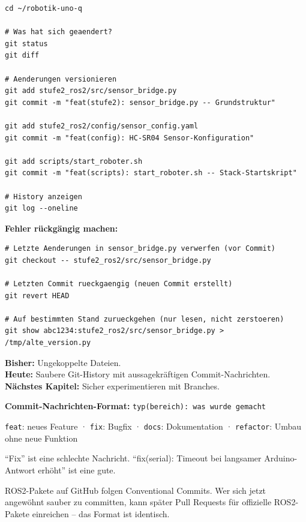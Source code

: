 \begin{lstlisting}[style=bash]
cd ~/robotik-uno-q

# Was hat sich geaendert?
git status
git diff

# Aenderungen versionieren
git add stufe2_ros2/src/sensor_bridge.py
git commit -m "feat(stufe2): sensor_bridge.py -- Grundstruktur"

git add stufe2_ros2/config/sensor_config.yaml
git commit -m "feat(config): HC-SR04 Sensor-Konfiguration"

git add scripts/start_roboter.sh
git commit -m "feat(scripts): start_roboter.sh -- Stack-Startskript"

# History anzeigen
git log --oneline
\end{lstlisting}

\begin{loesungBox}
\textbf{Fehler rückgängig machen:}
\begin{lstlisting}[style=bash]
# Letzte Aenderungen in sensor_bridge.py verwerfen (vor Commit)
git checkout -- stufe2_ros2/src/sensor_bridge.py

# Letzten Commit rueckgaengig (neuen Commit erstellt)
git revert HEAD

# Auf bestimmten Stand zurueckgehen (nur lesen, nicht zerstoeren)
git show abc1234:stufe2_ros2/src/sensor_bridge.py > /tmp/alte_version.py
\end{lstlisting}
\end{loesungBox}

\begin{projektBox}
\textbf{Bisher:} Ungekoppelte Dateien.\\
\textbf{Heute:} Saubere Git-History mit aussagekräftigen Commit-Nachrichten.\\
\textbf{Nächstes Kapitel:} Sicher experimentieren mit Branches.
\end{projektBox}

\begin{merksatzBox}
\textbf{Commit-Nachrichten-Format:} \texttt{typ(bereich): was wurde gemacht}

\texttt{feat}: neues Feature ·
\texttt{fix}: Bugfix ·
\texttt{docs}: Dokumentation ·
\texttt{refactor}: Umbau ohne neue Funktion

\enquote{Fix} ist eine schlechte Nachricht.
\enquote{fix(serial): Timeout bei langsamer Arduino-Antwort erhöht} ist eine gute.
\end{merksatzBox}

\begin{robotikBox}
ROS2-Pakete auf GitHub folgen Conventional Commits.
Wer sich jetzt angewöhnt sauber zu committen, kann
später Pull Requests für offizielle ROS2-Pakete einreichen --
das Format ist identisch.
\end{robotikBox}

